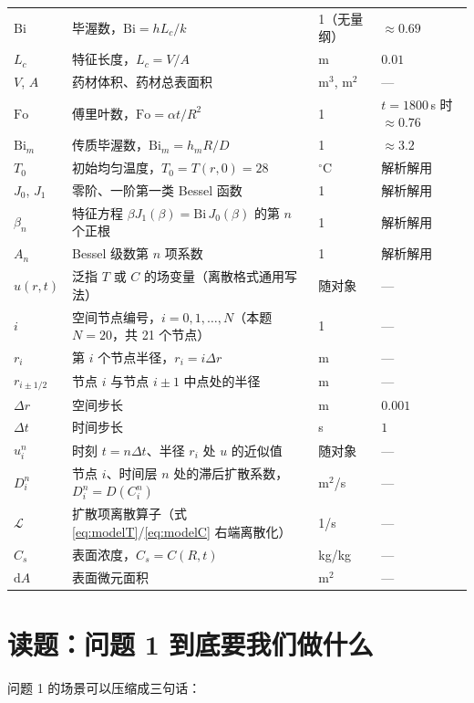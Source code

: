 \documentclass[12pt,a4paper]{ctexart}
\begin{document}
\begin{center}
\begin{tabular}{llll}
$\mathrm{Bi}$ & 毕渥数，$\mathrm{Bi}=hL_c/k$ & 1（无量纲） & $\approx0.69$ \\
$L_c$ & 特征长度，$L_c=V/A$ & m & $0.01$ \\
$V$, $A$ & 药材体积、药材总表面积 & m$^3$, m$^2$ & --- \\
$\mathrm{Fo}$ & 傅里叶数，$\mathrm{Fo}=\alpha t/R^2$ & 1 & $t=1800$\,s 时 $\approx0.76$ \\
$\mathrm{Bi}_m$ & 传质毕渥数，$\mathrm{Bi}_m=h_mR/D$ & 1 & $\approx3.2$ \\
$T_0$ & 初始均匀温度，$T_0=T(r,0)=28$ & $^\circ$C & 解析解用 \\
$J_0$, $J_1$ & 零阶、一阶第一类 Bessel 函数 & 1 & 解析解用 \\
$\beta_n$ & 特征方程 $\beta J_1(\beta)=\mathrm{Bi}\,J_0(\beta)$ 的第 $n$ 个正根 & 1 & 解析解用 \\
$A_n$ & Bessel 级数第 $n$ 项系数 & 1 & 解析解用 \\
$u(r,t)$ & 泛指 $T$ 或 $C$ 的场变量（离散格式通用写法） & 随对象 & --- \\
$i$ & 空间节点编号，$i=0,1,\dots,N$（本题 $N=20$，共 21 个节点） & 1 & --- \\
$r_i$ & 第 $i$ 个节点半径，$r_i=i\Delta r$ & m & --- \\
$r_{i\pm1/2}$ & 节点 $i$ 与节点 $i\pm1$ 中点处的半径 & m & --- \\
$\Delta r$ & 空间步长 & m & $0.001$ \\
$\Delta t$ & 时间步长 & s & $1$ \\
$u_i^n$ & 时刻 $t=n\Delta t$、半径 $r_i$ 处 $u$ 的近似值 & 随对象 & --- \\
$D_i^n$ & 节点 $i$、时间层 $n$ 处的滞后扩散系数，$D_i^n=D(C_i^n)$ & m$^2$/s & --- \\
$\mathcal{L}$ & 扩散项离散算子（式 \eqref{eq:modelT}/\eqref{eq:modelC} 右端离散化） & 1/s & --- \\
$C_s$ & 表面浓度，$C_s=C(R,t)$ & kg/kg & --- \\
$\mathrm{d}A$ & 表面微元面积 & m$^2$ & --- \\
\bottomrule
\end{tabular}
\end{center}

\section{读题：问题 1 到底要我们做什么}

问题 1 的场景可以压缩成三句话：
\end{document}
